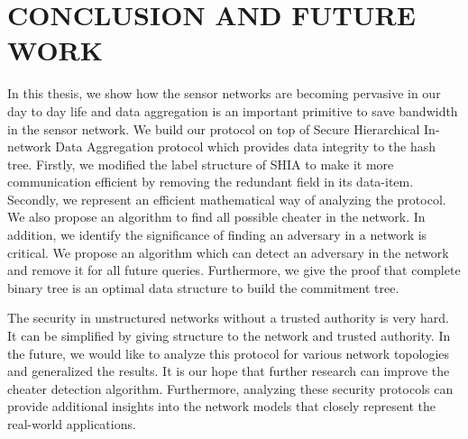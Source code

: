 \chapter{CONCLUSION AND FUTURE WORK} 
\label{cha:conclusion}

	In this thesis, we show how the sensor networks are becoming pervasive in our day to day life
	and data aggregation is an important primitive to save bandwidth in the sensor network.
	We build our protocol on top of Secure Hierarchical In-network Data Aggregation protocol which provides data integrity to the hash tree.
	Firstly, we modified the label structure of SHIA to make it more communication efficient by removing the redundant field in its data-item.
	Secondly, we represent an efficient mathematical way of analyzing the protocol. 
	We also propose an algorithm to find all possible cheater in the network.
	In addition, we identify the significance of finding an adversary in a network is critical. 
	We propose an algorithm which can detect an adversary in the network and remove it for all future queries.
	Furthermore, we give the proof that complete binary tree is an optimal data structure to build the commitment tree.

	The security in unstructured networks without a trusted authority is very hard.
	It can be simplified by giving structure to the network and trusted authority.
	In the future, we would like to analyze this protocol for various network topologies and generalized the results.
	It is our hope that further research can improve the cheater detection algorithm.
	Furthermore, analyzing these security protocols can provide additional insights into the network models that closely represent the real-world applications.  